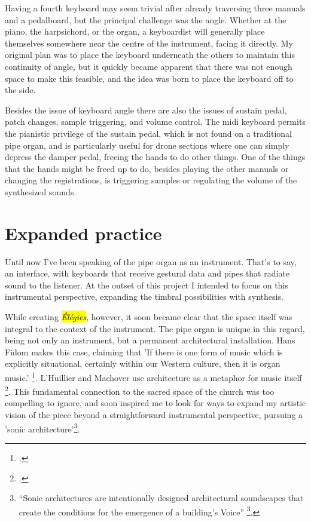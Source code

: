 \documentclass[12pt,twoside,maitrise]{dms_ks}
\theoremstyle{definition}
\begin{document}
{Having a fourth keyboard may seem trivial after already traversing three manuals and a pedalboard, but the principal challenge was the angle. 
Whether at the piano, the harpsichord, or the organ, a keyboardist will generally place themselves somewhere near the centre of the instrument, facing it directly. 
My original plan was to place the keyboard underneath the others to maintain this continuity of angle, but it quickly became apparent that there was not enough space to make this feasible, and the idea was born to place the keyboard off to the side. 

Besides the issue of keyboard angle there are also the issues of sustain pedal, patch changes, sample triggering, and volume control. 
The midi keyboard permits the pianistic privilege of the sustain pedal, which is not found on a traditional pipe organ, and is particularly useful for drone sections where one can simply depress the damper pedal, freeing the hands to do other things. 
One of the things that the hands might be freed up to do, besides playing the other manuals or changing the registrations, is triggering samples or regulating the volume of the synthesized sounds. 

\section{Expanded practice}

Until now I've been speaking of the pipe organ as an instrument. 
That's to say, an interface, with keyboards that receive gestural data and pipes that radiate sound to the listener. 
At the outset of this project I intended to focus on this instrumental perspective, expanding the timbral possibilities with synthesis.

While creating \hl{\textit{Élégies}}, however, it soon became clear that the space itself was integral to the context of the instrument. 
The pipe organ is unique in this regard, being not only an instrument, but a permanent architectural installation. 
Hans Fidom makes this case, claiming that 'If there is one form of music which is explicitly situational, certainly within our Western culture, then it is organ music.' \footcite[23]{fidom_music_2012}. 
L'Huillier and Machover use architecture as a metaphor for music itself \footcite[361]{lhuillier_spaces_2018}. 
This fundamental connection to the sacred space of the church was too compelling to ignore, and soon inspired me to look for ways to expand my artistic vision of the piece beyond a straightforward instrumental perspective, pursuing a 'sonic architecture'\footnote{“Sonic architectures are intentionally designed architectural soundscapes that create the conditions for the emergence of a building’s Voice” \footcite[2]{lacey_site-specific_2014}.}.

}
\end{document}
